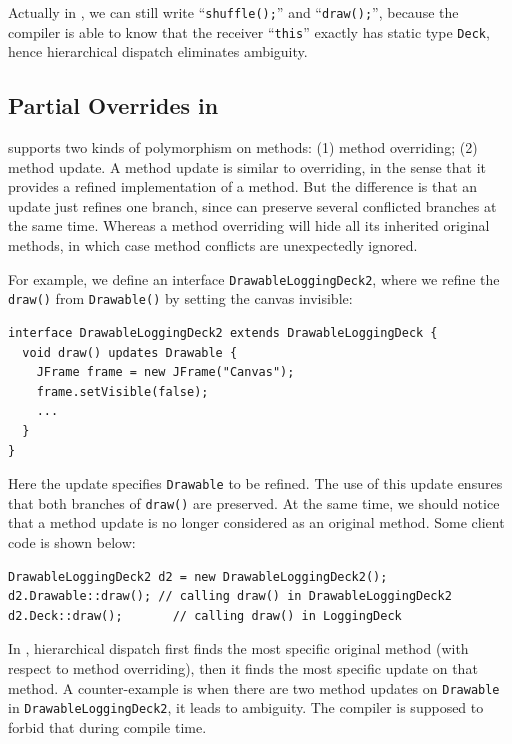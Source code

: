 Actually in \MIM{}, we can still write ``\lstinline|shuffle();|'' and ``\lstinline|draw();|'',
because the compiler is able to know that the receiver ``\lstinline|this|'' exactly has static type \lstinline|Deck|, hence hierarchical dispatch eliminates ambiguity.

\subsection{Partial Overrides in \MIM	} 

\MIM{} supports two kinds of polymorphism on methods: (1) method overriding; (2) method update. A method update is similar to overriding, in the sense that it provides a refined implementation of a method. But the difference is that an update just refines one branch, since \MIM{} can preserve several conflicted branches at the same time. Whereas a method overriding will hide all its inherited original methods, in which case method conflicts are unexpectedly ignored.

For example, we define an interface \lstinline|DrawableLoggingDeck2|, where we refine the \lstinline|draw()| from \lstinline|Drawable()| by setting
the canvas invisible:
\vspace{3pt}\begin{lstlisting}
interface DrawableLoggingDeck2 extends DrawableLoggingDeck {
  void draw() updates Drawable {
    JFrame frame = new JFrame("Canvas");
    frame.setVisible(false);
    ...
  }
}
\end{lstlisting}\vspace{3pt}
Here the update specifies \lstinline|Drawable| to be refined. The use of this update ensures that both branches of \lstinline|draw()| are preserved. At the same time, we should notice that a method update is no longer considered as an original method. Some client code is shown below:
\vspace{3pt}\begin{lstlisting}
DrawableLoggingDeck2 d2 = new DrawableLoggingDeck2();
d2.Drawable::draw(); // calling draw() in DrawableLoggingDeck2
d2.Deck::draw();       // calling draw() in LoggingDeck
\end{lstlisting}\vspace{3pt}

In \MIM{}, hierarchical dispatch first finds the most specific original method (with respect to method overriding), then it finds the most specific update on that method. A counter-example is when there are two method updates on \lstinline|Drawable| in \lstinline|DrawableLoggingDeck2|, it leads to ambiguity. The compiler is supposed to forbid that during compile time.

